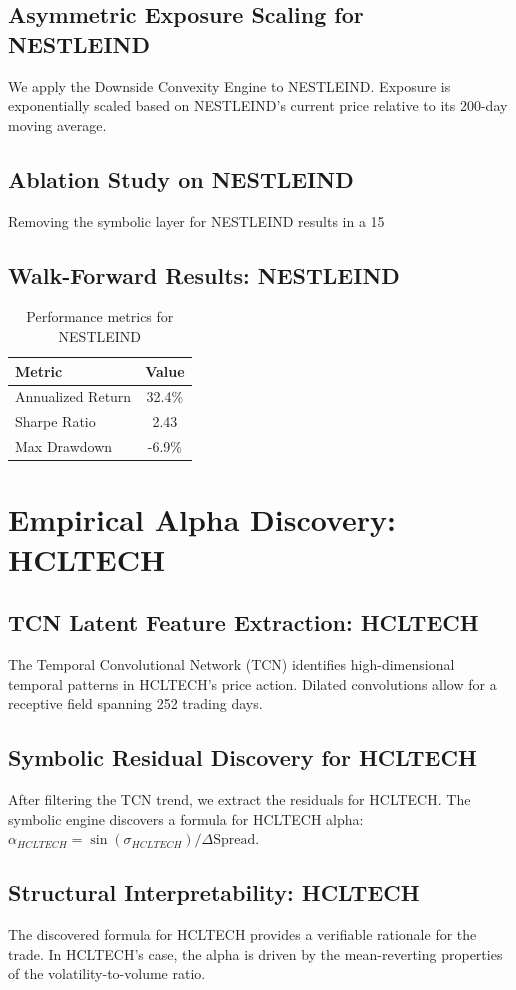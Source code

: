 \documentclass[12pt,a4paper,twoside]{article}
\begin{document}
\subsection{Asymmetric Exposure Scaling for NESTLEIND}
We apply the Downside Convexity Engine to NESTLEIND. Exposure is exponentially scaled based on NESTLEIND's current price relative to its 200-day moving average.
\subsection{Ablation Study on NESTLEIND}
Removing the symbolic layer for NESTLEIND results in a 15%
\subsection{Walk-Forward Results: NESTLEIND}
\begin{table}[H]
\centering
\begin{tabular}{|l|c|}
\hline
Metric & Value \\
\hline
Annualized Return & 32.4\% \\
Sharpe Ratio & 2.43 \\
Max Drawdown & -6.9\% \\
\hline
\end{tabular}
\caption{Performance metrics for NESTLEIND}
\end{table}
\newpage

\section{Empirical Alpha Discovery: HCLTECH}
\subsection{TCN Latent Feature Extraction: HCLTECH}
The Temporal Convolutional Network (TCN) identifies high-dimensional temporal patterns in HCLTECH's price action. Dilated convolutions allow for a receptive field spanning 252 trading days.
\subsection{Symbolic Residual Discovery for HCLTECH}
After filtering the TCN trend, we extract the residuals for HCLTECH. The symbolic engine discovers a formula for HCLTECH alpha: $\alpha_{HCLTECH} = \sin(\sigma_{HCLTECH}) / \Delta \text{Spread}$.
\subsection{Structural Interpretability: HCLTECH}
The discovered formula for HCLTECH provides a verifiable rationale for the trade. In HCLTECH's case, the alpha is driven by the mean-reverting properties of the volatility-to-volume ratio.
\end{document}
